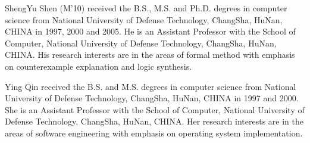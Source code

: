 \documentclass[journal]{IEEEtran}
\begin{document}
{%





\begin{IEEEbiography}{ShengYu Shen}
(M'10) received the B.S., M.S.
and Ph.D. degrees in computer science from
National University of Defense Technology, ChangSha, HuNan, CHINA in 1997, 2000 and 2005.
He is an Assistant Professor with the School of Computer,
National University of Defense Technology, ChangSha, HuNan, CHINA.
His research
interests are in the areas of formal method with emphasis on counterexample explanation
and logic synthesis.
\end{IEEEbiography}

\begin{IEEEbiography}{Ying Qin}
 received the B.S. and M.S.
degrees in computer science from
National University of Defense Technology, ChangSha, HuNan, CHINA in 1997 and 2000.
She is an Assistant Professor with the School of Computer,
National University of Defense Technology, ChangSha, HuNan, CHINA.
Her research
interests are in the areas of software engineering with emphasis on operating system implementation.
\end{IEEEbiography}

}
\end{document}
